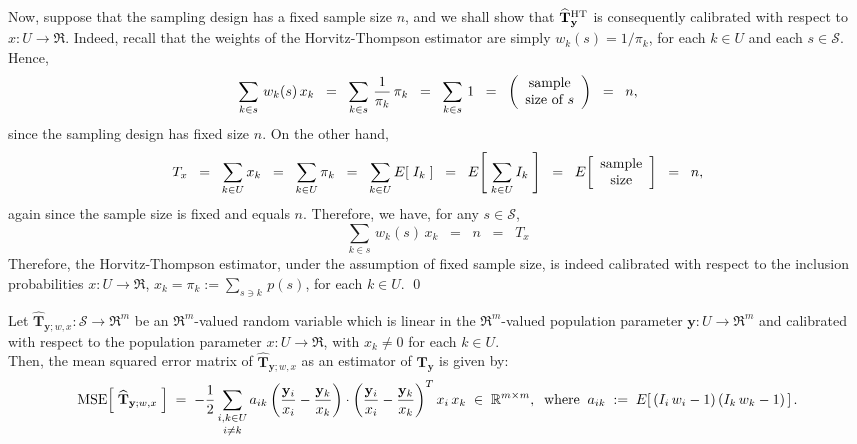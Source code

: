 \documentclass{article}
\begin{document}
\begin{example}
Now, suppose that the sampling design has a fixed sample size $n$,
and we shall show that $\widehat{\mathbf{T}}^{\textnormal{HT}}_{\mathbf{y}}$
is consequently calibrated with respect to $x : U \longrightarrow \Re$.
Indeed, recall that the weights of the Horvitz-Thompson estimator are simply
$w_{k}(s) = 1 / \pi_{k}$, for each $k \in U$ and each $s \in \mathcal{S}$.
Hence,
\begin{equation*}
\sum_{k \in s}\,w_{k}(s)\,x_{k}
\;\;=\;\; \sum_{k \in s}\,\dfrac{1}{\pi_{k}}\,\pi_{k}
\;\;=\;\; \sum_{k \in s}\,1
\;\;=\;\; \left(\begin{array}{c} \textnormal{sample} \\ \textnormal{size of $s$} \end{array}\right)
\;\;=\;\; n,
\end{equation*}
since the sampling design has fixed size $n$.
On the other hand,
\begin{equation*}
T_{x}
\;\;=\;\;\sum_{k\in U}x_{k}
\;\;=\;\; \sum_{k \in U}\pi_{k}
\;\;=\;\; \sum_{k \in U}E\!\left[\;I_{k}\;\right]
\;\;=\;\; E\!\left[\;\sum_{k \in U}I_{k}\;\right]
\;\;=\;\; E\!\left[\begin{array}{c} \textnormal{sample} \\ \textnormal{size} \end{array}\right]
\;\;=\;\; n,
\end{equation*}
again since the sample size is fixed and equals $n$.
Therefore, we have, for any $s \in \mathcal{S}$,
\begin{equation*}
\sum_{k \in s}\,w_{k}(s)\,x_{k}
\;\;=\;\; n
\;\;=\;\; T_{x}
\end{equation*}
Therefore, the Horvitz-Thompson estimator, under the assumption of fixed sample size,
is indeed calibrated with respect to the inclusion probabilities $x : U \longrightarrow \Re$,
$x _{k} = \pi_{k} := \sum_{s \ni k}\,p(s)$, for each $k \in U$. \qed
\end{example}

\begin{proposition}
\label{proposition:calibratedLinear:MSE}
\mbox{}
\vskip 0.1cm
\noindent
Let $\widehat{\mathbf{T}}_{\mathbf{y};w,x} : \mathcal{S} \longrightarrow \Re^{m}$ be an $\Re^{m}$-valued random variable 
which is linear in the $\Re^{m}$-valued population parameter $\mathbf{y} : U \longrightarrow \Re^{m}$
and calibrated with respect to the population parameter $x : U \longrightarrow \Re$, with $x_{k} \neq 0$ for each $k \in U$.\\
Then, the mean squared error matrix of $\widehat{\mathbf{T}}_{\mathbf{y};w,x}$ as an estimator of $\mathbf{T}_{\mathbf{y}}$ is given by:
\begin{equation*}
\textnormal{MSE}\!\left[\;\widehat{\mathbf{T}}_{\mathbf{y};w,x}\;\right]
\;=\;
- \dfrac{1}{2}\,\underset{i \neq k}{\sum_{i,k\in U}}\,a_{ik}
\left(\dfrac{\mathbf{y}_{i}}{x_{i}} - \dfrac{\mathbf{y}_{k}}{x_{k}}\right)\cdot\left(\dfrac{\mathbf{y}_{i}}{x_{i}} - \dfrac{\mathbf{y}_{k}}{x_{k}}\right)^{T}
x_{i}\,x_{k}
\;\in\;\mathbb{R}^{m \times m},
\;\;\textnormal{where}\;\;
a_{ik} \;:=\; E\!\left[\,\left(I_{i}\,w_{i}-1\right)\left(I_{k}\,w_{k}-1\right)\,\right].
\end{equation*}
\end{proposition}
\end{document}
